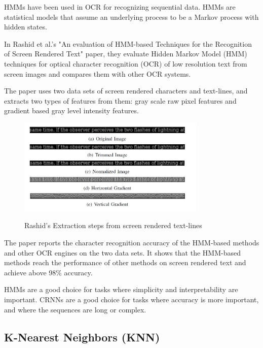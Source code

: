 HMMs have been used in OCR for recognizing sequential data. HMMs are statistical models that assume an underlying process to be a Markov process with hidden states.


In Rashid et al.'s "An evaluation of HMM-based Techniques for the Recognition of Screen Rendered Text" paper, they evaluate Hidden Markov Model (HMM) techniques for optical character recognition (OCR) of low resolution text from screen images and compares them with other OCR systems.

The paper uses two data sets of screen rendered characters and text-lines, and extracts two types of features from them: gray scale raw pixel features and gradient based gray level intensity features.


\begin{figure}[!h]
    \centering
    \includegraphics[width=0.8\textwidth]{Figures/HMM_Rashid.jpg}
    \caption[Rashid's Extraction steps from screen rendered text-lines]{Rashid's Extraction steps from screen rendered text-lines}\cite{rashidEvaluationHMMBasedTechniques2011}
    \label{fig:Rashid Feature Extraction Steps}
\end{figure}

The paper reports the character recognition accuracy of the HMM-based methods and other OCR engines on the two data sets. It shows that the HMM-based methods reach the performance of other methods on screen rendered text and achieve above 98\% accuracy.\cite{rashidEvaluationHMMBasedTechniques2011}

HMMs are a good choice for tasks where simplicity and interpretability are important. CRNNs are a good choice for tasks where accuracy is more important, and where the sequences are long or complex.

\newpage

\subsection{K-Nearest Neighbors (KNN)}

